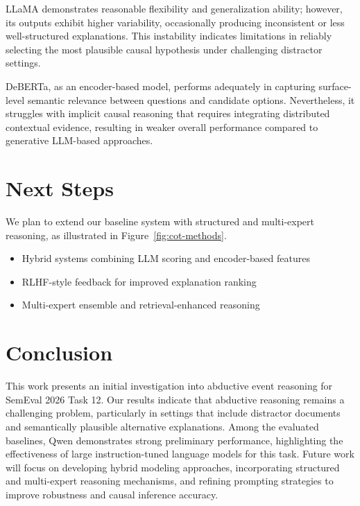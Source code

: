 \documentclass[11pt]{article}
\begin{document}
LLaMA demonstrates reasonable flexibility and generalization ability; however, its outputs exhibit higher variability, occasionally producing inconsistent or less well-structured explanations. This instability indicates limitations in reliably selecting the most plausible causal hypothesis under challenging distractor settings.

DeBERTa, as an encoder-based model, performs adequately in capturing surface-level semantic relevance between questions and candidate options. Nevertheless, it struggles with implicit causal reasoning that requires integrating distributed contextual evidence, resulting in weaker overall performance compared to generative LLM-based approaches.


\section{Next Steps}

We plan to extend our baseline system with structured and multi-expert reasoning,
as illustrated in Figure~\ref{fig:cot-methods}.

\begin{itemize}
    \item Hybrid systems combining LLM scoring and encoder-based features
    \item RLHF-style feedback for improved explanation ranking
    \item Multi-expert ensemble and retrieval-enhanced reasoning
\end{itemize}


\section{Conclusion}

This work presents an initial investigation into abductive event reasoning for SemEval 2026 Task 12. Our results indicate that abductive reasoning remains a challenging problem, particularly in settings that include distractor documents and semantically plausible alternative explanations. Among the evaluated baselines, Qwen demonstrates strong preliminary performance, highlighting the effectiveness of large instruction-tuned language models for this task. Future work will focus on developing hybrid modeling approaches, incorporating structured and multi-expert reasoning mechanisms, and refining prompting strategies to improve robustness and causal inference accuracy.

\newpage
\end{document}
